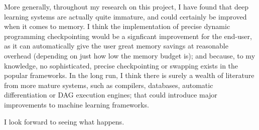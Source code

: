 More generally, throughout my research on this project, I have found that deep learning systems are actually quite immature, and could certainly be improved when it comes to memory.
I think the implementation of precise dynamic programming checkpointing would be a signficant improvement for the end-user, as it can automatically give the user great memory savings at reasonable overhead (depending on just how low the memory budget is);
and because, to my knowledge, no sophisticated, precise checkpointing or swapping exists in the popular frameworks.
In the long run, I think there is surely a wealth of literature from more mature systems, such as compilers, databases, automatic differentiation or DAG execution engines;
that could introduce major improvements to machine learning frameworks.

I look forward to seeing what happens.
